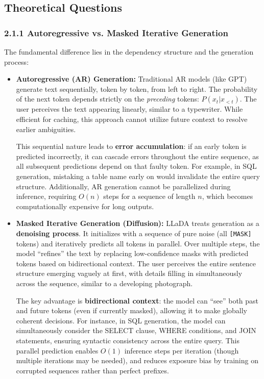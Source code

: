 \documentclass[a4paper,12pt]{article}
\begin{document}
\subsection{Theoretical Questions}

\subsubsection*{2.1.1 Autoregressive vs. Masked Iterative Generation}
The fundamental difference lies in the dependency structure and the generation process:

\begin{itemize}
\item \textbf{Autoregressive (AR) Generation:} Traditional AR models (like GPT) generate text sequentially, token by token, from left to right. The probability of the next token depends strictly on the \textit{preceding} tokens: $P(x_t | x_{<t})$. The user perceives the text appearing linearly, similar to a typewriter. While efficient for caching, this approach cannot utilize future context to resolve earlier ambiguities.

This sequential nature leads to \textbf{error accumulation}: if an early token is predicted incorrectly, it can cascade errors throughout the entire sequence, as all subsequent predictions depend on that faulty token. For example, in SQL generation, mistaking a table name early on would invalidate the entire query structure. Additionally, AR generation cannot be parallelized during inference, requiring $O(n)$ steps for a sequence of length $n$, which becomes computationally expensive for long outputs.

\item \textbf{Masked Iterative Generation (Diffusion):} LLaDA treats generation as a \textbf{denoising process}. It initializes with a sequence of pure noise (all \texttt{[MASK]} tokens) and iteratively predicts all tokens in parallel. Over multiple steps, the model ``refines'' the text by replacing low-confidence masks with predicted tokens based on bidirectional context. The user perceives the entire sentence structure emerging vaguely at first, with details filling in simultaneously across the sequence, similar to a developing photograph.

The key advantage is \textbf{bidirectional context}: the model can ``see'' both past and future tokens (even if currently masked), allowing it to make globally coherent decisions. For instance, in SQL generation, the model can simultaneously consider the SELECT clause, WHERE conditions, and JOIN statements, ensuring syntactic consistency across the entire query. This parallel prediction enables $O(1)$ inference steps per iteration (though multiple iterations may be needed), and reduces exposure bias by training on corrupted sequences rather than perfect prefixes.
\end{itemize}
\end{document}
